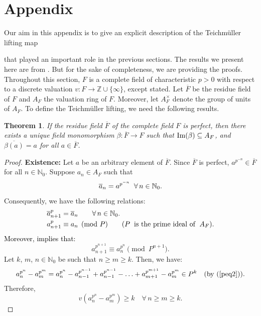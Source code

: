 \documentclass[times,10pt]{amsart}
\newcommand{\n}{\ensuremath{\infty}}
\newtheorem{thm}{Theorem}[section]
\begin{document}
 
\section{Appendix}\label{S6}

{Our aim in this appendix is to give} an  explicit description of  the Teichm\"uller lifting map {that played an important role in {the previous sections}.  The results we  present here are
  from  \cite[chapter 7]{Sc}.   But  for the sake of completeness, we are providing the proofs. 
Throughout  this {section},  $F$ is a complete  field of {characteristic $p>0$} with respect to a discrete valuation $v: F\xrightarrow{} \mathbb{Z}\cup\{\n\}$, {except stated.} Let    $\overline{F}$ be   the residue field  of $ {F}$ and $A_F$ the valuation ring of $F$. Moreover, {let $ A_F^{\times}$ denote}  the group of units of $A_F$. To define the Teichm\"uller lifting, we need the following results.  

\begin{thm}\label{p1t}
     If   the residue field  $\overline{F}$ of the complete field $F$ is perfect, then there exists a unique field
     monomorphism  
     $ \displaystyle{\beta: \overline{F}\xrightarrow{}} F$ such that  ${\rm Im}\displaystyle{(\beta)\subseteq A_F}$, and $\displaystyle{  \overline{\beta({a})}={a}}$ for all $\displaystyle{a\in \overline{F}}$.  
\end{thm}
 
\begin{proof}
      \textbf{Existence:} Let  $ {a}$ be an arbitrary element of $ \overline{F}.$ Since  $\overline{F}$ is  perfect, $ {a}^{p^{-n}}\in \overline{F}$ for all $n\in \mathbb{N}_0.$ Suppose $  a_n\in A_F$ such 
      that \begin{equation}\label{peq1} \overline{a}_n= a^{p^{-n}}\hspace{2mm}\forall\, n\in \mathbb{N}_0.\end{equation} Consequently, we have the following relations: 
      \begin{align*}
    {\overline{a}^p_{n+1}} &=\overline{a}_n \qquad \forall\, n\in \mathbb{N}_0.\\  a^p_{n+1}&\equiv a_n\pmod{P} \qquad (P \hspace{2mm} \text{is   the  
 prime ideal  of }\hspace{1mm} A_F).\end{align*} \textcolor{black}{Moreover, \cite[Chapter 7, Lemma 33]{Sc} implies that:} \begin{equation}\label{peq2}
  a^{p^{n+1}}_{n+1}\equiv a^{p^n}_n\pmod{P^{n+1}} . \end{equation} 
      Let  $k$, $m$, $n\in \mathbb{N}_0$ be such that  $n\geq m\geq k$. Then, we have: \[ a_n^{p^n}- a_m^{p^m}= a_n^{p^n}-a^{p^{n-1}}_{n-1}+ a_{n-1}^{p^{n-1}}- \ldots + a_{m+1}^{p^{m+1}}-a_m^{p^m} \in P^k \quad\text{(by (\ref{peq2}))}.  \] Therefore, $$ \displaystyle{v\left( a_n^{p^n}-a_m^{p^m}\right)\geq k\quad \forall\, n\geq m\geq k}.$$ 
      

\end{proof}}
\end{document}
